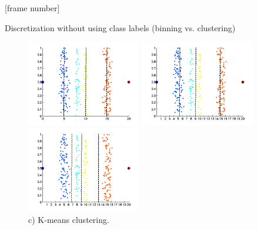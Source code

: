 \documentclass[aspectratio=169,t]{beamer}
\begin{document}
  {
    [frame number]
    \begin{frame}{Discretization without using class labels (binning vs. clustering)}
    \begin{figure}[H]
        \centering
        \begin{minipage}{0.32\textwidth}
            \includegraphics[width=5cm]{img/binningvsclustering2.png}
            \caption{a) Equal interval width (binning).}
        \end{minipage}
        \begin{minipage}{0.32\textwidth}
            \centering
            \includegraphics[width=5cm]{img/binningvsclustering3.png}
            \caption{b) Equal frequency (binning).}
        \end{minipage}
        \begin{minipage}{0.32\textwidth}
            \centering
            \includegraphics[width=5cm]{img/binningvsclustering4.png}
            \caption{c) K-means clustering.}
        \end{minipage}\hfill
    \end{figure}
    \end{frame}
  }
\end{document}
